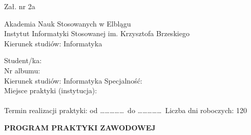 \documentclass[11pt,a4paper]{article}
\begin{document}
\begin{flushright}
Zał. nr 2a
\end{flushright}

\noindent
Akademia Nauk Stosowanych w Elblągu \\
Instytut Informatyki Stosowanej im. Krzysztofa Brzeskiego \\
Kierunek studiów: Informatyka

\vspace{1em}

\noindent Student/ka: \dotfill \\
Nr albumu: \dotfill \\
Kierunek studiów: Informatyka \hfill Specjalność: \dotfill \\
Miejsce praktyki (instytucja): \dotfill \\
\dotfill \\
Termin realizacji praktyki: od \dots\dots\dots\dots\dots\ do \dots\dots\dots\dots\dots\ \hfill Liczba dni roboczych: 120

\vspace{2em}
\begin{center}
\textbf{PROGRAM PRAKTYKI ZAWODOWEJ}
\end{center}
\end{document}
